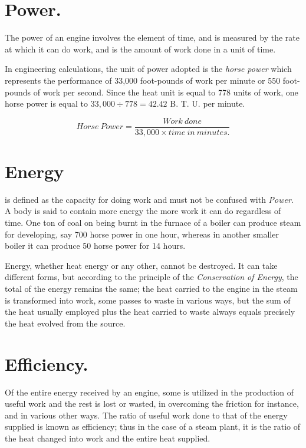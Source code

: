 \documentclass[11pt, a5paper]{book}
\begin{document}
\section{Power.}The power of an engine involves the element of time,
and is measured by the rate at which it can do work, and is the amount
of work done in a unit of time.\par

In engineering calculations, the unit of power adopted is the
\textit{horse power} which represents the performance of 33,000
foot-pounds of work per minute or 550 foot-pounds of work per second.
Since the heat unit is equal to 778 units of work, one horse power is
equal to $33,000 \div 778 = 42.42$ B. T. U. per minute.\par

\begin{equation*}
  Horse\:Power = \frac{Work\:done}{33,000 \times time\:in\:minutes.}
\end{equation*}

\section{Energy}is defined as the capacity for doing work and must not
be confused with \textit{Power}.  A body is said to contain more
energy the more work it can do regardless of time.  One ton of coal on
being burnt in the furnace of a boiler can produce steam for
developing, say 700 horse power in one hour, whereas in another
smaller boiler it can produce 50 horse power for 14 hours.\par

Energy, whether heat energy or any other, cannot be destroyed.  It can
take different forms, but according to the principle of the
\textit{Conservation of Energy}, the total of the energy remains the
same; the heat carried to the engine in the steam is transformed into
work, some passes to waste in various ways, but the sum of the heat
usually employed plus the heat carried to waste always equals
precisely the heat evolved from the source.\par

\section{Efficiency.}Of the entire energy received by an engine,
some is utilized in the production of useful work and the rest is lost
or wasted, in overcoming the friction for instance, and in various
other ways.  The ratio of useful work done to that of the energy
supplied is known as efficiency; thus in the case of a steam plant, it
is the ratio of the heat changed into work and the entire heat
supplied.\par
\end{document}
